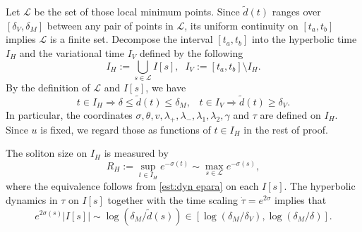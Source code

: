 \documentclass[reqno, 11pt]{amsart}
\numberwithin{equation}{section}
\theoremstyle{plain}
\theoremstyle{definition}
\numberwithin{equation}{section}
\numberwithin{theorem}{section}
\numberwithin{equation}{section}
\numberwithin{equation}{section}
\numberwithin{theorem}{section}
\begin{document}
	Let $\mathscr{L}$ be the set of those local minimum points. Since $\widetilde{d}(t)$ ranges over $[\delta
	_V,\delta_{M}]$ between any pair of points in $\mathscr{L}$, its uniform continuity on $[t_{a},t_{b}]$ implies $\mathscr{L}$ is a finite set. Decompose the interval $[t_{a},t_{b}]$ into the hyperbolic time $I_H$ and the variational time $I_V$ defined by the following 
	\begin{equation*}
	I_{H}:=\bigcup_{s\in\mathscr{L} }I[s],\;\; I_V:=[t_{a},t_{b}]\setminus I_{H}.
	\end{equation*}
	By the definition of $\mathscr{L}$ and $I[s]$, we have
	\begin{equation*}
	t\in I_{H}\Longrightarrow \delta\leq \widetilde{d}(t)\leq \delta_{M} ,\;\;\; t\in I_V \Longrightarrow  \widetilde{d}(t)\geq \delta_{V}.
	\end{equation*}
	In particular, the coordinates $\sigma,\theta,v,\lambda_+,\lambda_{-},\lambda_{1},\lambda_{2},\gamma$ and $\tau$ are defined on $I_{H}$. Since $u$ is fixed, we regard those as functions of $t\in I_{H}$ in the rest of proof.
	
	The soliton size on $I_{H}$ is measured by
	\begin{equation}\label{quan:size IH}
	R_{H}:=\sup_{t\in I_{H}}e^{-\sigma(t)} \sim \max_{s\in \mathscr{L}}e^{-\sigma(s)},
	\end{equation}
	where the equivalence follows from \eqref{est:dyn epara} on each $I[s]$. The hyperbolic dynamics in $\tau$ on $I[s]$ together with the time scaling $\dot{\tau}=e^{2\sigma}$ implies that
	\begin{equation*}
	e^{2\sigma(s)}|I[s]|\sim \log(\delta_{M}/\widetilde{d}(s))\in [\log(\delta_{M}/\delta_{V}),\log(\delta_{M}/\delta)].
	\end{equation*}
	
	
	
\end{document}
